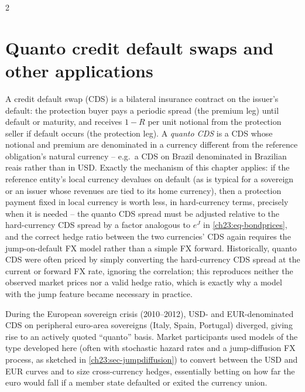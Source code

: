 \begin{paracol}{2}
\section{Quanto credit default swaps and other applications}\label{ch23:sec-quanto-cds}
A credit default swap (CDS) is a bilateral insurance contract on the issuer's default: the protection buyer pays a
periodic spread (the premium leg) until default or maturity, and receives $1-R$ per unit notional from the
protection seller if default occurs (the protection leg). A \emph{quanto CDS} is a CDS whose notional and premium
are denominated in a currency different from the reference obligation's natural currency -- e.g.\ a CDS on Brazil
denominated in Brazilian reais rather than in USD. Exactly the mechanism of this chapter applies: if the reference
entity's local currency devalues on default (as is typical for a sovereign or an issuer whose revenues are tied to
its home currency), then a protection payment fixed in local currency is worth less, in hard-currency terms,
precisely when it is needed -- the quanto CDS spread must be adjusted relative to the hard-currency CDS spread by
a factor analogous to $e^J$ in \cref{ch23:eq-bondprices}, and the correct hedge ratio between the two currencies'
CDS again requires the jump-on-default FX model rather than a simple FX forward. Historically, quanto CDS were
often priced by simply converting the hard-currency CDS spread at the current or forward FX rate, ignoring the
correlation; this reproduces neither the observed market prices nor a valid hedge ratio, which is exactly why a
model with the jump feature became necessary in practice.

\begin{casestudy}
During the European sovereign crisis (2010--2012), USD- and EUR-denominated CDS on peripheral euro-area sovereigns
(Italy, Spain, Portugal) diverged, giving rise to an actively quoted ``quanto'' basis. Market participants used
models of the type developed here (often with stochastic hazard rates and a jump-diffusion FX process, as sketched
in \cref{ch23:sec-jumpdiffusion}) to convert between the USD and EUR curves and to size cross-currency hedges,
essentially betting on how far the euro would fall if a member state defaulted or exited the currency union.
\end{casestudy}


\end{paracol}
